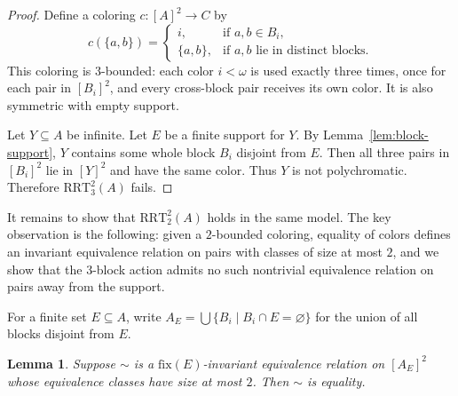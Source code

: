\documentclass[11pt]{amsart}
\newtheorem{lemma}[theorem]{Lemma}
\theoremstyle{definition}
\newcommand{\RRT}{\mathrm{RRT}}
\begin{document}
\begin{proof}
Define a coloring \(c:[A]^2\to C\) by
\[
    c(\{a,b\})=
    \begin{cases}
        i, & \text{if }a,b\in B_i,\\
        \{a,b\}, & \text{if }a,b\text{ lie in distinct blocks.}
    \end{cases}
\]
This coloring is \(3\)-bounded: each color \(i<\omega\) is used exactly three times, once for each pair in \([B_i]^2\), and every cross-block pair receives its own color.  It is also symmetric with empty support.

Let \(Y\subseteq A\) be infinite.  Let \(E\) be a finite support for \(Y\).  By Lemma~\ref{lem:block-support}, \(Y\) contains some whole block \(B_i\) disjoint from \(E\).  Then all three pairs in \([B_i]^2\) lie in \([Y]^2\) and have the same color.  Thus \(Y\) is not polychromatic.  Therefore \(\RRT^2_3(A)\) fails.
\end{proof}

It remains to show that \(\RRT^2_2(A)\) holds in the same model.  The key observation is the following: given a \(2\)-bounded coloring, equality of colors defines an invariant equivalence relation on pairs with classes of size at most \(2\), and we show that the \(3\)-block action admits no such nontrivial equivalence relation on pairs away from the support.

For a finite set \(E\subseteq A\), write \(A_E=\bigcup\{B_i\mid B_i\cap E=\varnothing\}\) for the union of all blocks disjoint from \(E\).

\begin{lemma}
Suppose \(\sim\) is a \(\mathrm{fix}(E)\)-invariant equivalence relation on \([A_E]^2\) whose equivalence classes have size at most \(2\).  Then \(\sim\) is equality.
\end{lemma}
\end{document}
